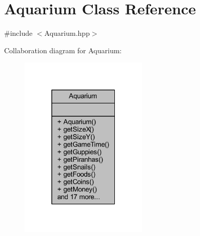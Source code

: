 \hypertarget{class_aquarium}{}\section{Aquarium Class Reference}
\label{class_aquarium}


{\ttfamily \#include $<$Aquarium.\+hpp$>$}



Collaboration diagram for Aquarium\+:
\nopagebreak
\begin{figure}[H]
\begin{center}
\leavevmode
\includegraphics[width=172pt]{class_aquarium__coll__graph}
\end{center}
\end{figure}
